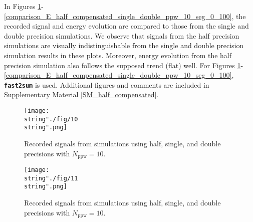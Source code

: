 \documentclass[10pt]{article}
\begin{document}
In Figures \ref{comparison_V_half_compensated_single_double_ppw_10_seg_0_2}-\ref{comparison_E_half_compensated_single_double_ppw_10_seg_0_100}, the recorded signal and energy evolution are compared to those from the single and double precision simulations.
% 
We observe that signals from the half precision simulations are 
visually indistinguishable from the single and double precision simulation results in these plots.
%
Moreover, energy evolution from the half precision simulation also follows the supposed trend (flat) well.%
%
\footnotemark
{}
%
For Figures \ref{comparison_V_half_compensated_single_double_ppw_10_seg_0_2}-\ref{comparison_E_half_compensated_single_double_ppw_10_seg_0_100}, 
\textbf{\texttt{\small fast2sum}} is used.%
%
\footnotemark
{}
%
Additional figures and comments are included in Supplementary Material \ref{SM_half_compensated}. 


\begin{figure}[H]
\captionsetup{width=1\textwidth, font=footnotesize,labelfont=footnotesize}
\centering
%
\centering\texttt{[image: \\string"./fig/10\\string".png]}
%
\caption{Recorded signals from simulations using half, single, and double precisions with $N_\text{ppw}=10$.}
\label{comparison_V_half_compensated_single_double_ppw_10_seg_0_2}
\end{figure}


\begin{figure}[H]
\captionsetup{width=1\textwidth, font=footnotesize,labelfont=footnotesize}
\centering
%
\centering\texttt{[image: \\string"./fig/11\\string".png]}
%
\caption{Recorded signals from simulations using half, single, and double precisions with $N_\text{ppw}=10$.}
\label{comparison_V_half_compensated_single_double_ppw_10_seg_10_12}
\end{figure}
\end{document}
